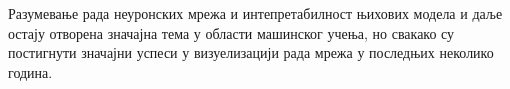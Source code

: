 \documentclass[a4paper]{article}
\begin{document}
Разумевање рада неуронских мрежа и интепретабилност њихових модела и даље остају
отворена значајна тема у области машинског учења, но свакако су постигнути
значајни успеси у визуелизацији рада мрежа у последњих неколико година.

\newpage
\newpage
{}
\appendix

%

\end{document}
